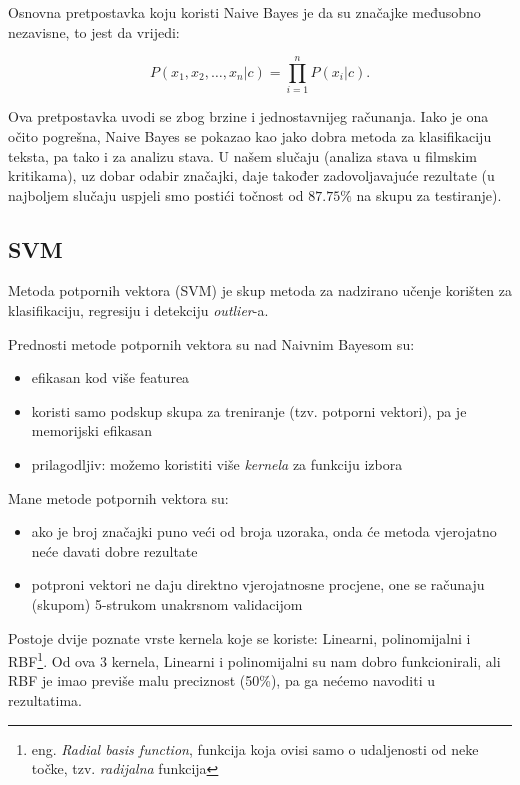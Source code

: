 \documentclass[conference]{IEEEtran}
\begin{document}
Osnovna pretpostavka koju koristi Naive Bayes je da su značajke međusobno nezavisne, to jest da vrijedi:

\[P(x_1, x_2, \ldots, x_n|c) = \prod_{i=1}^n P(x_i|c).\]

Ova pretpostavka uvodi se zbog brzine i jednostavnijeg računanja. Iako je ona očito pogrešna, Naive Bayes se pokazao kao jako dobra metoda za klasifikaciju teksta, pa tako i za analizu stava. U našem slučaju (analiza stava u filmskim kritikama), uz dobar odabir značajki, daje također zadovoljavajuće rezultate (u najboljem slučaju uspjeli smo postići točnost od $87.75\%$ na skupu za testiranje).

\subsection{SVM}

Metoda potpornih vektora (SVM) je skup metoda za nadzirano učenje korišten za
klasifikaciju, regresiju i detekciju \textit{outlier}-a.

Prednosti metode potpornih vektora su nad Naivnim Bayesom su:

\begin{itemize}
  \item efikasan kod više featurea
  \item koristi samo podskup skupa za treniranje (tzv. potporni vektori), pa je
    memorijski efikasan
  \item prilagodljiv: možemo koristiti više \textit{kernela} za funkciju izbora
\end{itemize}

Mane metode potpornih vektora su:

\begin{itemize}
  \item ako je broj značajki puno veći od broja uzoraka, onda će metoda vjerojatno
    neće davati dobre rezultate
  \item potproni vektori ne daju direktno vjerojatnosne procjene, one se računaju
    (skupom) 5-strukom unakrsnom validacijom
\end{itemize}

Postoje dvije poznate vrste kernela koje se koriste: Linearni, polinomijalni i
RBF\footnote{eng. \textit{Radial basis function}, funkcija koja ovisi samo o
udaljenosti od neke točke, tzv. \textit{radijalna} funkcija}. Od ova 3 kernela,
Linearni i polinomijalni su nam dobro funkcionirali, ali RBF je imao previše
malu preciznost (50\%), pa ga nećemo navoditi u rezultatima.
\end{document}
